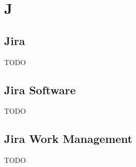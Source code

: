\section{J}

\subsection{Jira}
TODO

\subsection{Jira Software}
TODO

\subsection{Jira Work Management}
TODO